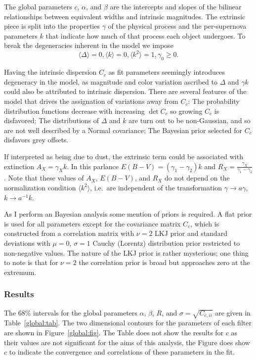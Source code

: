 \documentclass[11pt, oneside]{article}   	%
\begin{document}
The global parameters $c$, $\alpha$, and $\beta$ are the intercepts and slopes of the bilinear relationships between equivalent widths
and intrinsic magnitudes.  The extrinsic piece is split into the properties $\gamma$ of the physical process and the per-supernova 
parameters $k$ that indicate how much of that process each object undergoes.  To break the degeneracies inherent in the model we impose
\begin{equation*}
\langle \Delta \rangle=0, \langle k \rangle=0, \langle k^2 \rangle=1, \gamma_0 \ge 0.
\end{equation*}

Having the intrinsic dispersion $C_c$ as fit parameters seemingly introduces degeneracy in the model, as magnitude and color variation
ascribed to $\Delta$ and $\gamma k$ could also be attributed to intrinsic dispersion.  There are several features of the model
that drives the assignation of variations away from $C_c$:  The probability distribution functions decrease
with increasing $\det{C_c}$ so growing $C_c$ is disfavored; The distributions of $\Delta$ and $k$ are turn out to
be non-Gaussian, and so are not well described by a Normal covariance; The Bayesian prior selected for $C_c$ disfavors
grey offsets.

If interpreted as being due to dust, the extrinsic term could be associated with extinction $A_X = \gamma_X k$.  In
this parlance $E(B-V) = (\gamma_1-\gamma_2) k$ and $R_X = \frac{\gamma_X}{\gamma_1-\gamma_2}$.
Note that these values of $A_X$, $E(B-V)$, and $R_X$ do not depend on the normalization condition $ \langle k^2 \rangle$, i.e.\
are independent of the transformation $\gamma \rightarrow a\gamma$, $k \rightarrow a^{-1} k$.

As I perform an Bayesian analysis some mention of priors is required.  A flat prior is used for all parameters except
for the covariance matrix $C_c$, which is constructed from a correlation matrix with  $\nu=2$  LKJ prior and standard
deviations with
 $\mu=0$, $\sigma=1$ Cauchy (Lorentz) distribution prior restricted to non-negative values.
The nature of the LKJ prior is rather mysterious; one thing to note is that for $\nu=2$ the correlation prior is broad but
approaches zero at the extremum.

\subsubsection{Results}
The 68\% intervals for the global parameters $\alpha$, $\beta$, $R$, and $\sigma = \sqrt{C_{c,ii}}$  are given in Table~\ref{global:tab}.
The two dimensional contours for the parameters of each filter are shown in Figure~\ref{global:fig}.  The Table does not show
the results for $c$ as their values are not significant for the aims of this analysis, the Figure does show $c$ to indicate the convergence
and correlations of these parameters in the fit.
\end{document}
